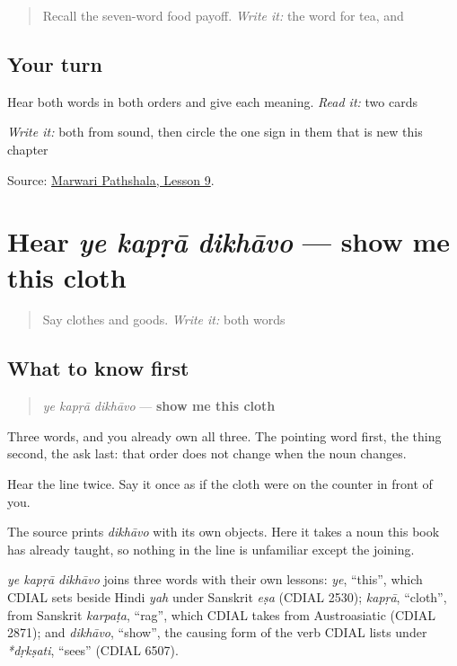 \label{lesson:MW-R21-show-two}



\begin{quote}
Recall the seven-word food payoff. \emph{Write it:} the word for tea, and \textbf{}
\end{quote}

\subsection*{Your turn}
Hear both words in both orders and give each meaning. \emph{Read it:} two cards

\emph{Write it:} both from sound, then circle the one sign in them that is new this chapter

\begin{tcolorbox}[breakable,colback=teal!4,colframe=teal!35!black,title={Before you move on}]
Source: \href{https://www.marwaripathshala.com/marwari-lesson-9-english}{Marwari Pathshala, Lesson 9}.
\end{tcolorbox}
\section[ye kapṛā dikhāvo]{Hear \emph{ye kapṛā dikhāvo} — show me this cloth}

\label{lesson:MW-C21-hear-show-request}



\begin{quote}
Say clothes and goods. \emph{Write it:} both words
\end{quote}

\subsection*{What to know first}
\begin{quote}
\emph{ye kapṛā dikhāvo} — \textbf{show me this cloth}
\end{quote}

Three words, and you already own all three. The pointing word first, the thing second, the ask last: that order does not change when the noun changes.

Hear the line twice. Say it once as if the cloth were on the counter in front of you.

The source prints \emph{dikhāvo} with its own objects. Here it takes a noun this book has already taught, so nothing in the line is unfamiliar except the joining.

\begin{cousinweb}
\emph{ye kapṛā dikhāvo} joins three words with their own lessons: \emph{ye}, \textquotedblleft{}this\textquotedblright{}, which CDIAL sets beside Hindi \emph{yah} under Sanskrit \emph{eṣa} (CDIAL 2530); \emph{kapṛā}, \textquotedblleft{}cloth\textquotedblright{}, from Sanskrit \emph{karpaṭa}, \textquotedblleft{}rag\textquotedblright{}, which CDIAL takes from Austroasiatic (CDIAL 2871); and \emph{dikhāvo}, \textquotedblleft{}show\textquotedblright{}, the causing form of the verb CDIAL lists under \emph{*dṛkṣati}, \textquotedblleft{}sees\textquotedblright{} (CDIAL 6507).
\end{cousinweb}

